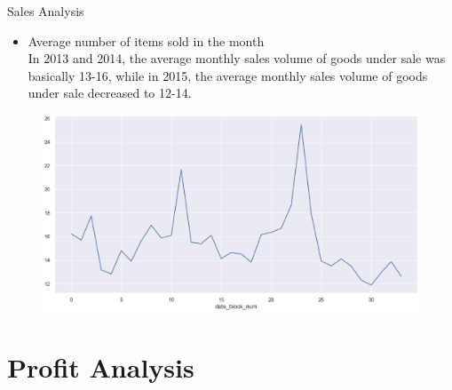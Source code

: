 \documentclass[
 size=14pt,
 paper=smartboard,  %
 mode=present, 		%
 display=slides, 	%
 style=tuliplab,  	%
 pauseslide,
 fleqn,leqno]{powerdot}
\begin{document}
\begin{slide}{Sales Analysis}
  
  \begin{itemize}
  \item  Average number of items sold in the month\\
    In 2013 and 2014, the average monthly sales volume of goods under sale was basically 13-16,
    while in 2015, the average monthly sales volume of goods under sale decreased to 12-14.
\end{itemize}
\begin{figure}[htbp]
  \centering
  \begin{minipage}[t]{0.28\textwidth}
    \centering
    \centerline{\includegraphics[width=3\textwidth]{logos/aveitem.eps}}
    \vspace{-1.0em}
  \end{minipage}
\end{figure}
\end{slide}

\section{Profit  Analysis}

\end{document}
